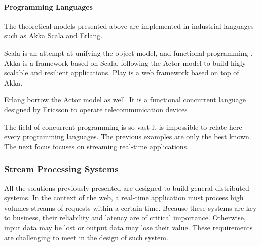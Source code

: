 




\paragraph{Programming Languages}

The theoretical models presented above are implemented in industrial languages such as Akka Scala and Erlang.

Scala is an attempt at unifying the object model, and functional programming \cite{Odersky2004}.
Akka is a framework based on Scala, following the Actor model to build higly scalable and resilient applications.
Play is a web framework based on top of Akka.

Erlang borrow the Actor model as well.
It is a functional concurrent language designed by Ericsson to operate telecommunication devices \cite{JoeArmstrong,Nelson2004} %

The field of concurrent programming is so vast it is impossible to relate here every programming languages.
The previous examples are only the best known.
The next focus focuses on streaming real-time applications.


\subsubsection{Stream Processing Systems}

All the solutions previously presented are designed to build general distributed systems.
In the context of the web, a real-time application must process high volumes streams of requests within a certain time.
Because these systems are key to business, their reliability and latency are of critical importance.
Otherwise, input data may be lost or output data may lose their value.
These requirements are challenging to meet in the design of such system.

